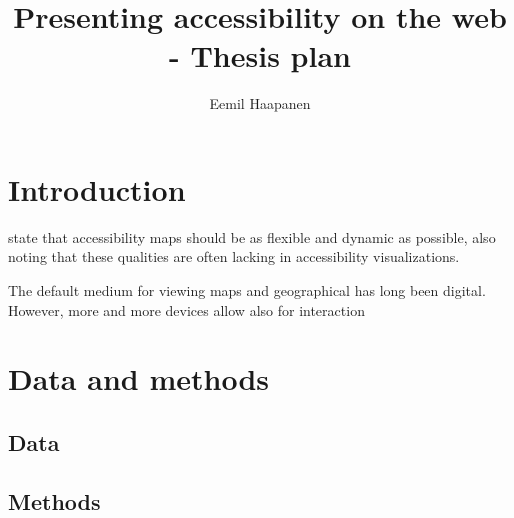 \documentclass{article}
\title{Presenting accessibility on the web - Thesis plan}
\author{Eemil Haapanen}
\begin{document}
\maketitle

\section{Introduction}
\textcite{but2018} state that accessibility maps should be as flexible and dynamic as possible,
also noting that these qualities are often lacking in accessibility visualizations.

The default medium for viewing maps and geographical has long been digital.  %
However, more and more devices allow also for interaction \parencite{mei2019}


\section{Data and methods}

\subsection{Data}
\subsection{Methods}

\printbibliography
\end{document}
